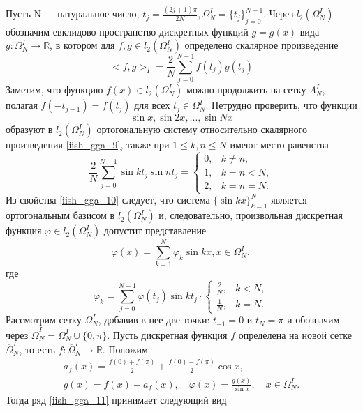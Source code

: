 Пусть N --- натуральное число, $t_j = \frac{(2j+1)\pi}{2N}, \Omega^I_N = { \{ t_j \} }_{j=0}^{N-1}$. Через $l_2(\Omega^{I}_{N})$ обозначим евклидово пространство дискретных функций $g = g(x)$ вида $g : \Omega^I_N \rightarrow \mathbb{R}$, в котором для $f, g \in l_2(\Omega^I_N)$ определено скалярное произведение
\begin{equation}
<f, g>_I = \frac{2}{N} \sum\limits_{j=0}^{N-1} f(t_j)g(t_j) \label{iish_gga_9}
\end{equation}
Заметим, что функцию $f(x) \in l_2(\Omega^I_N)$ можно продолжить на сетку $\Lambda^I_N$, полагая $f(-t_{j-1}) = f(t_j) $ для всех $t_j \in \Omega^I_N$.
Нетрудно проверить, что функции
$$
\sin{x}, \sin{2x}, ..., \sin{Nx}
$$
образуют в $l_2(\Omega^I_N)$ ортогональную систему относительно скалярного произведения \eqref{iish_gga_9}, также при $1 \leq k, n \leq N$ имеют место равенства
\begin{equation}
\frac{2}{N} \sum\limits_{j=0}^{N-1} \sin{k t_j} \sin{n t_j} = \begin{cases} 0, & k \neq n, \\ 1, & k = n < N, \\ 2, & k = n = N. \end{cases} \label{iish_gga_10}
\end{equation}
Из свойства \eqref{iish_gga_10} следует, что система ${\{ \sin kx \}}_{k=1}^N$ является ортогональным базисом в $l_2(\Omega_N^I)$ и, следовательно, произвольная дискретная функция $\varphi \in l_2(\Omega_N^I)$
допустит представление
\begin{equation}
  \varphi(x) = \sum\limits_{k=1}^N \varphi_k \sin kx, x \in \Omega_N^I, \label{iish_gga_11}
\end{equation}
где
\begin{equation}
  \varphi_k = \sum\limits_{j=0}^{N-1} \varphi(t_j)\sin kt_j \cdot \begin{cases}\frac2N, & k < N, \\ \frac1N, & k = N.\end{cases} \label{iish_gga_12}
\end{equation}
Рассмотрим сетку $\Omega_N^I$, добавив в нее две точки: $t_{-1}=0$ и $t_N=\pi$ и обозначим через $\overline{\Omega}_N^I = \Omega_N^I \cup \{0, \pi\}$.
Пусть дискретная функция $f$ определена на новой сетке $\overline{\Omega}_N^I$, то есть $f: \overline{\Omega}_N^I \rightarrow \mathbb{R}$.
Положим
\begin{gather}
a_f(x) = \frac{f(0) + f(\pi)}2 + \frac{f(0) - f(\pi)}2\cos x, \label{iish_gga_13}\\
g(x)=f(x) - a_f(x), \quad
\varphi(x) = \frac{g(x)}{\sin x}, \quad x \in \Omega_N^I. \label{iish_gga_14}
\end{gather}
Тогда ряд \eqref{iish_gga_11} принимает следующий вид

